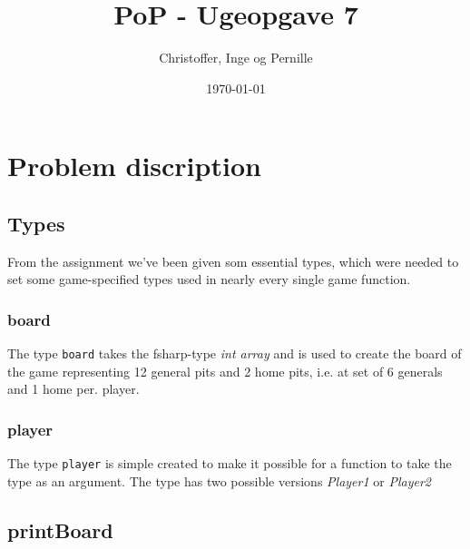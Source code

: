 \documentclass[a4paper]{report}
\title{PoP - Ugeopgave 7}
\author{Christoffer, Inge og Pernille}
\date{\today}
\begin{document}
\maketitle

\section*{Problem discription}

\subsection*{Types}
From the assignment we've been given som essential types, which were needed to set some game-specified types used in nearly every single game function.



\subsubsection*{board}
The type \texttt{board} takes the fsharp-type \textsl{int array} and is used to create the board of the game representing 12 general pits and 2 home pits, i.e. at set of 6 generals and 1 home per. player.

\subsubsection*{player}
The type \texttt{player} is simple created to make it possible for a function to take the type as an argument. The type has two possible versions \textsl{Player1} or \textsl{Player2}


\subsection*{printBoard}



\end{document}
